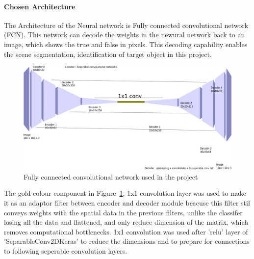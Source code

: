 \documentclass[paper=a4, fontsize=11pt]{scrartcl} %
\numberwithin{equation}{section} %
\numberwithin{figure}{section} %
\numberwithin{table}{section} %
\begin{document}
\paragraph{Chosen Architecture}
The Architecture of the Neural network is Fully connected convolutional network (FCN). This network can decode the weights in the newural network back to an image, which shows the true and false in pixels. This decoding capability enables the scene segmentation, identification of target object in this project.

\begin{figure}[htp]
	\centering
	\includegraphics[scale=0.35]{./imgs/FCN.png}
	\caption{Fully connected convolutional network used in the project}
	\label{fig:FCN}
\end{figure}
The gold colour component in Figure~\ref{fig:FCN}, 1x1 convolution layer was used to make it as an adaptor filter between encoder and decoder module beacuse this filter stil conveys weights with the spatial data in the previous filters, unlike the classifer losing all the data and flattened, and only reduce dimension of the matrix, which removes computational bottlenecks. 1x1 convolution was used after 'relu' layer of 'SeparableConv2DKeras' to reduce the dimensions and to prepare for connections to following seperable convolution layers.
\end{document}
